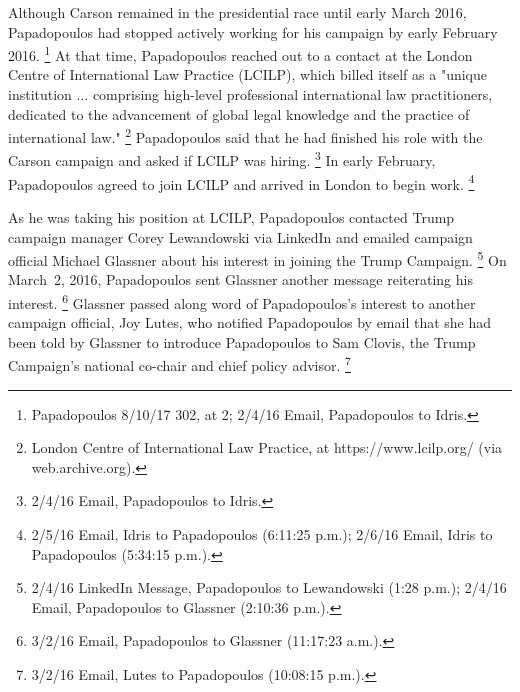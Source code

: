 Although Carson remained in the presidential race until early March 2016, Papadopoulos had stopped actively working for his campaign by early February 2016.%
\footnote{Papadopoulos 8/10/17 302, at 2; 2/4/16 Email, Papadopoulos to Idris.}
At that time, Papadopoulos reached out to a contact at the London Centre of International Law Practice (LCILP), which billed itself as a "unique institution ... comprising high-level professional international law practitioners, dedicated to the advancement of global legal knowledge and the practice of international law."%
\footnote{London Centre of International Law Practice, at https://www.lcilp.org/ (via web.archive.org).}
Papadopoulos said that he had finished his role with the Carson campaign and asked if LCILP was hiring.%
\footnote{2/4/16 Email, Papadopoulos to Idris.}
In early February, Papadopoulos agreed to join LCILP and arrived in London to begin work.%
\footnote{2/5/16 Email, Idris to Papadopoulos (6:11:25 p.m.);
2/6/16 Email, Idris to Papadopoulos (5:34:15 p.m.).}

As he was taking his position at LCILP, Papadopoulos contacted Trump campaign manager Corey Lewandowski via LinkedIn and emailed campaign official Michael Glassner about his interest in joining the Trump Campaign.%
\footnote{2/4/16 LinkedIn Message, Papadopoulos to Lewandowski (1:28 p.m.);
2/4/16 Email, Papadopoulos to Glassner (2:10:36 p.m.).}
On March~2, 2016, Papadopoulos sent Glassner another message reiterating his interest.%
\footnote{3/2/16 Email, Papadopoulos to Glassner (11:17:23 a.m.).}
Glassner passed along word of Papadopoulos's interest to another campaign official, Joy Lutes, who notified Papadopoulos by email that she had been told by Glassner to introduce Papadopoulos to Sam Clovis, the Trump Campaign's national co-chair and chief policy advisor.%
\footnote{3/2/16 Email, Lutes to Papadopoulos (10:08:15 p.m.).}

